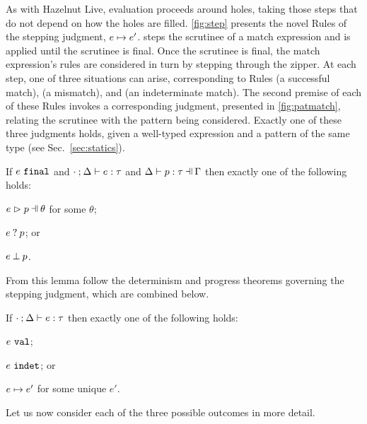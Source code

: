 As with Hazelnut Live, evaluation proceeds around holes, taking those steps that do not depend on how the holes are filled. 
\autoref{fig:step} presents the novel Rules of the stepping judgment, $e \mapsto e'$. \ITExpMatch steps the scrutinee of a match expression and is applied until the scrutinee is final. Once the scrutinee is final, the match expression's rules are considered in turn by stepping through the zipper. At each step, one of three situations can arise, corresponding to Rules \ITSuccMatch{} (a successful match), \ITMisMatch (a mismatch), and \IMatch (an indeterminate match). The second premise of each of these Rules invokes a corresponding judgment, presented in \autoref{fig:patmatch},  relating the scrutinee with the pattern being considered. Exactly one of these three judgments holds, given a well-typed expression and a pattern of the same type (see Sec.~\ref{sec:statics}).

%


\begin{lemma}
  \label{lemma:match-determinism}
  If $e ~\mathtt{final}$ and $\cdot \mathbin{;} \Delta \vdash e : \tau$ and $\hpattyp{p}{\tau}{\Gamma}{\Delta}$ then exactly one of the following holds:
  \begin{enumerate*}
    \item $\hpatmatch{e}{p}{\theta}$ for some $\theta$;
    \item $e \mathbin{?} p$; or
    \item $e \mathbin{\bot} p$.
  \end{enumerate*}
\end{lemma}
From this lemma follow the determinism and progress theorems governing the stepping judgment, which are combined below.
\begin{theorem}
  \label{theorem:determinism}
  If $\cdot \mathbin{;} \Delta \vdash e : \tau$ then exactly one of the following holds:
  \begin{enumerate*}
    \item $e ~\mathtt{val}$;
    \item $e ~\mathtt{indet}$; or 
    \item $e \mapsto e'$ for some unique $e'$.
  \end{enumerate*}
\end{theorem}

Let us now consider each of the three possible outcomes in more detail.


